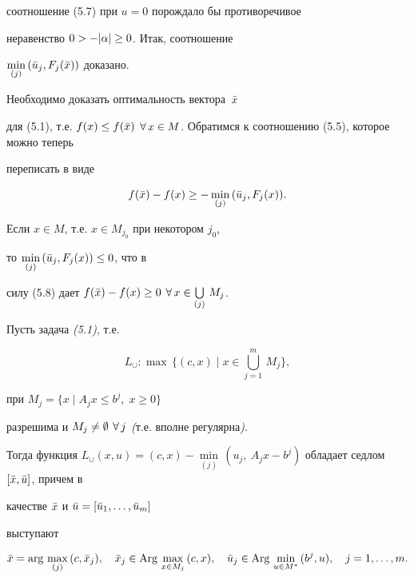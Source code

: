 \begin{pf}
соотношение (5.7) при $u = 0$ порождало бы противоречивое


неравенство $0 > - |\alpha|\ge 0$. Итак, соотношение


$\min\limits_{(j)}\, (\Bar{u}_j, F_j (\Bar{x}))$ доказано.





Необходимо доказать оптимальность вектора~$\Bar{x}$ 


для (5.1), т.е. $f(x) \le f(\Bar{x})$ $\fo\, x \in


M$. Обратимся к соотношению (5.5), которое можно теперь


переписать в виде


\begin{equation}


f(\Bar{x}) - f(x) \ge -\min_{(j)}\, (\Bar{u}_j, F_j (x)).


\end{equation}


Если $x \in M$, т.е. $x \in M_{j_0}$ при некотором $j_0$,


то $\min\limits_{(j)}\, (\Bar{u}_j, F_j (x)) \le 0$, что в


силу (5.8) дает $f(\Bar{x}) -f(x) \ge 0$ $\fo\, x \in


\bigcup\limits_{(j)}\, M_j$.


\end{pf}





\begin{lems}


Пусть задача {\em (5.1)}, т.е.


$$


L_{\cup}: \max\, \bigl\{ (c, x) \mid x \in \bigcup_{j=1}^m\, M_j \bigr\},


$$


при $M_j = \{ x \mid A_j x \le b^j,\; x \ge 0 \}$


разрешима и $M_j \ne \emptyset$ $\forall\,j$ {\em (}т.е. вполне регулярна{\em )}.


Тогда функция $L_{\cup}(x, u) =(c, x) -\min\limits_{(j)}\, (u_j,\


A_j x - b^j)$ обладает седлом $[ \Bar{x}, \Bar{u} ]$, причем в


качестве $\Bar{x}$ и $\Bar{u} = [ \Bar{u}_1,\dotsc,\Bar{u}_m ]$


выступают


$$


\Bar{x} =\arg\, \max_{(j)}\, (c, \Bar{x}_j),\quad


\Bar{x}_j \in \Arg\, \max_{x \in M_j}\, (c, x),\quad


\Bar{u}_j \in \Arg\, \min_{u \in M^*}\, (b^j, u),\quad j=\ij{m}.


$$


\end{lems}





